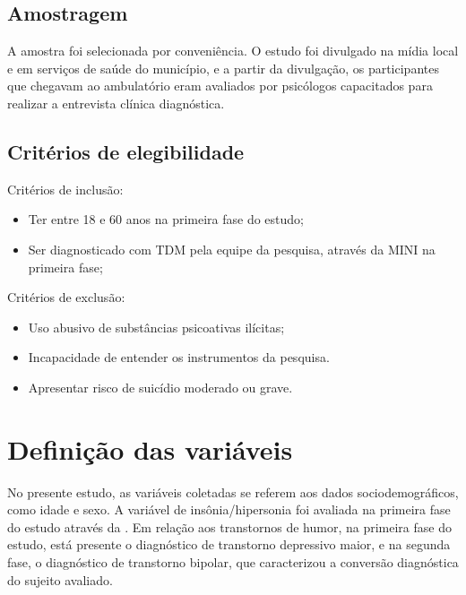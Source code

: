 \documentclass[chapter=TITLE,
               oneside,
               12pt,
               a4paper,
               english,
               brazil]{abntex2}    %
\begin{document}
        \subsection{Amostragem} 
    
            A amostra foi selecionada por conveniência. O estudo foi divulgado na mídia
            local e em serviços de saúde do município, e a partir da divulgação,
            os participantes que chegavam ao ambulatório eram avaliados por psicólogos
            capacitados para realizar a entrevista clínica diagnóstica.

        \subsection{Critérios de elegibilidade}

            Critérios de inclusão:

            \begin{itemize}

                \item Ter entre 18 e 60 anos na primeira fase do estudo;

                \item Ser diagnosticado com TDM pela equipe da pesquisa,
                através da MINI na primeira fase;

            \end{itemize}

            Critérios de exclusão:

            \begin{itemize}

                \item Uso abusivo de substâncias psicoativas ilícitas;

                \item Incapacidade de entender os instrumentos da pesquisa.

                \item Apresentar risco de suicídio moderado ou grave.

    \end{itemize}

    \section{Definição das variáveis}\label{sec:variaveis}

        No presente estudo, as variáveis coletadas se referem aos dados
        sociodemográficos, como idade e sexo.
        A variável de insônia/hipersonia foi avaliada na primeira fase do estudo
        através da .
        Em relação aos transtornos de humor, na primeira fase do estudo,
        está presente o diagnóstico de transtorno depressivo maior, e na
        segunda fase, o diagnóstico de transtorno bipolar, que caracterizou
        a conversão diagnóstica do sujeito avaliado.
\end{document}
